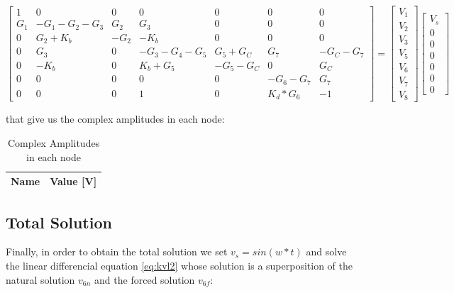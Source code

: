 $$
\begin{bmatrix}
  1 & 0 & 0 & 0 & 0 & 0 & 0 \\
  G_{1} & -G_{1}-G_{2}-G_{3} & G_{2} & G_{3} & 0 & 0 & 0 \\
  0 & G_{2}+K_{b} & -G_{2} & -K_{b} & 0 & 0 & 0 \\
  0 & G_{3} & 0 & -G_{3}-G_{4}-G_{5} & G_{5}+G_{C} & G_{7} & -G_{C} -G_{7} \\
  0 & -K_{b} & 0 & K_{b}+G_{5} & -G_{5}-G_{C} & 0 & G_{C} \\
  0 & 0 & 0 & 0 & 0 & -G_{6}-G_{7} & G_{7} \\
  0 & 0 & 0 & 1 & 0 & K_{d}*G_{6} & -1
\end{bmatrix}
=
\begin{bmatrix}
  V_{1}\\
  V_{2}\\
  V_{3}\\
  V_{5}\\
  V_{6}\\
  V_{7}\\
  V_{8}
\end{bmatrix}
\begin{bmatrix}
  V_{s}\\
  0\\
  0\\
  0\\
  0\\
  0\\
  0
\end{bmatrix}
$$

that give us the complex amplitudes in each node:
\begin{table} [H]
  \centering
  \begin{tabular}{|l|r|}
    \hline    
    {\bf Name} & {\bf Value [V]} \\ \hline
    
  \end{tabular}
  \caption{Complex Amplitudes in each node}
  \label{tab:volt3}
\end{table}


\newpage
\subsection{Total Solution}
\label{subsec:total_solution}

Finally, in order to obtain the total solution we set $v_{s}=sin(w*t)$ and solve the linear differencial equation \ref{eq:kvl2} whose solution is a superposition of the natural solution $v_{6n}$ and the forced solution $v_{6f}$:

